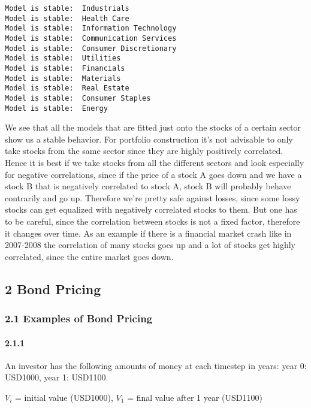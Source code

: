 \documentclass[11pt]{article}
\begin{document}
    \begin{Verbatim}[commandchars=\\\{\}]
Model is stable:  Industrials
Model is stable:  Health Care
Model is stable:  Information Technology
Model is stable:  Communication Services
Model is stable:  Consumer Discretionary
Model is stable:  Utilities
Model is stable:  Financials
Model is stable:  Materials
Model is stable:  Real Estate
Model is stable:  Consumer Staples
Model is stable:  Energy
    \end{Verbatim}

    We see that all the models that are fitted just onto the stocks of a
certain sector show us a stable behavior. For portfolio construction
it's not advisable to only take stocks from the same sector since they
are highly positively correlated. Hence it is best if we take stocks
from all the different sectors and look especially for negative
correlations, since if the price of a stock A goes down and we have a
stock B that is negatively correlated to stock A, stock B will probably
behave contrarily and go up. Therefore we're pretty safe against losses,
since some lossy stocks can get equalized with negatively correlated
stocks to them. But one has to be careful, since the correlation between
stocks is not a fixed factor, therefore it changes over time. As an
example if there is a financial market crash like in 2007-2008 the
correlation of many stocks goes up and a lot of stocks get highly
correlated, since the entire market goes down.

    \hypertarget{bond-pricing}{%
\subsection{2 Bond Pricing}\label{bond-pricing}}

    \hypertarget{examples-of-bond-pricing}{%
\subsubsection{2.1 Examples of Bond
Pricing}\label{examples-of-bond-pricing}}

    \hypertarget{section}{%
\paragraph{2.1.1}\label{section}}

    An investor has the following amounts of money at each timestep in
years: year 0: USD1000, year 1: USD1100.

    \(V_{i}\) = initial value (USD1000), \(V_{1}\) = final value after 1
year (USD1100)
\end{document}
